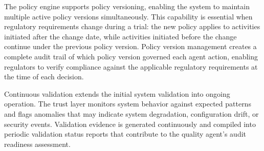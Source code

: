 The policy engine supports policy versioning, enabling the system to maintain multiple
active policy versions simultaneously. This capability is essential when regulatory
requirements change during a trial: the new policy applies to activities initiated
after the change date, while activities initiated before the change continue under the
previous policy version. Policy version management creates a complete audit trail of
which policy version governed each agent action, enabling regulators to verify compliance
against the applicable regulatory requirements at the time of each decision.

Continuous validation extends the initial system validation into ongoing operation. The
trust layer monitors system behavior against expected patterns and flags anomalies that
may indicate system degradation, configuration drift, or security events. Validation
evidence is generated continuously and compiled into periodic validation status reports
that contribute to the quality agent's audit readiness assessment.
